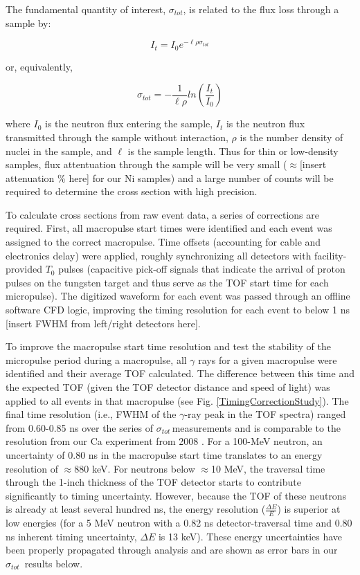 \documentclass[twocolumn,secnumarabic,amssymb, nobibnotes, aps, prl,
superscriptaddress, nobalancelastpage]{revtex4}
\newcommand{\tot}{\ensuremath{\sigma_{tot}}}
\newcommand{\tots}{\ensuremath{\sigma_{tot}}\,}
\begin{document}
The fundamental quantity of interest, \tot, is related to the flux
loss through a sample by:

\begin{equation}
I_{t} = I_{0}e^{-{\ell\rho\sigma_{tot}}}
\end{equation}

or, equivalently,

\begin{equation}
    \tot = -\frac{1}{\ell\rho}ln\left(\frac{I_{t}}{I_{0}}\right)
\end{equation}

where $I_{0}$ is the neutron flux entering the sample, $I_{t}$ is the neutron
flux transmitted through the sample without interaction, $\rho$ is the number
density of nuclei in the sample, and $\ell$ is the sample length. Thus for thin
or low-density samples, flux attentuation through the sample will be very small
($\approx$[insert attenuation \% here] for our Ni samples) and a large number
of counts will be required to determine the cross section with high
precision.

To calculate cross sections from raw event data, a series of corrections are
required. First, all macropulse start times were identified and each event was
assigned to the correct macropulse. Time offsets (accounting for cable and
electronics delay) were applied, roughly synchronizing all detectors with
facility-provided $T_{0}$ pulses (capacitive pick-off signals that
indicate the arrival of proton pulses on the tungsten target and thus serve as
the TOF start time for each micropulse). The digitized waveform for each event was passed through an
offline software CFD logic, improving the timing resolution for each event to
below 1 ns [insert FWHM from left/right detectors here].

To improve the macropulse start time resolution and test the stability of the
micropulse period during a macropulse, all $\gamma$ rays for a given macropulse
were identified and their average TOF calculated. The difference between this
time and the expected TOF (given the TOF detector distance and speed of light)
was applied to all events in that macropulse (see Fig.
\ref{TimingCorrectionStudy}). The final time resolution (i.e., FWHM of the
$\gamma$-ray peak in the TOF spectra) ranged from 0.60-0.85 ns over the series of
\tots measurements and is comparable to the resolution from our Ca experiment
from 2008 \cite{Shane2010}. For a 100-MeV neutron, an uncertainty of 0.80 ns in
the macropulse start time translates to an energy resolution of $\approx$880
keV. For neutrons below $\approx$10 MeV, the traversal time through
the 1-inch thickness of the TOF detector starts to contribute significantly
to timing uncertainty. However, because the TOF of these neutrons is already at
least several hundred ns, the energy resolution ($\frac{\Delta E}{E}$) is
superior at low energies (for a 5 MeV neutron with a 0.82 ns detector-traversal time and
0.80 ns inherent timing uncertainty, $\Delta E$ is 13 keV). These energy uncertainties
have been properly propagated through analysis and are shown as error bars in our \tots 
results below.
\end{document}
